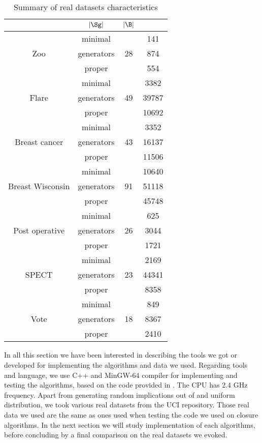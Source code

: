 \begin{table}[ht]
	\centering
	\begin{tabular}{| c | c | c | c |}
		\hline \rowcolor{clouds}
		\multicolumn{2}{|c|}{$\I$} & $|\Sg|$ & $|\B|$ \\ \hline
		\multirow{3}{*}{Zoo} & minimal & \multirow{3}{*}{28} & 141 \\
		& generators & & 874 \\
		& proper & & 554 \\ \hline
		
		\multirow{3}{*}{Flare} & minimal & \multirow{3}{*}{49} & 3382 \\
		& generators & & 39787 \\
		& proper & & 10692 \\ \hline
		
		\multirow{3}{*}{Breast cancer} & minimal & \multirow{3}{*}{43} & 3352 \\
		& generators & & 16137 \\
		& proper & & 11506 \\ \hline
		
		\multirow{3}{*}{Breast Wisconsin} & minimal & \multirow{3}{*}{91} & 10640 \\
		& generators & & 51118 \\
		& proper & & 45748 \\ \hline
		
		\multirow{3}{*}{Post operative} & minimal & \multirow{3}{*}{26} & 625 \\
		& generators & & 3044 \\
		& proper & & 1721 \\ \hline
		
		\multirow{3}{*}{SPECT} & minimal & \multirow{3}{*}{23} & 2169 \\
		& generators & & 44341 \\
		& proper & & 8358 \\ \hline
		
		\multirow{3}{*}{Vote} & minimal & \multirow{3}{*}{18} & 849 \\
		& generators & & 8367 \\
		& proper & & 2410 \\ \hline
	\end{tabular}
\caption{Summary of real datasets characteristics}
\label{tab:real-DS}
\end{table}


In all this section we have been interested in describing the tools we got or developed for implementing the algorithms and data we used. Regarding tools and language, we use C++ and MinGW-64 compiler for implementing and testing the algorithms, based on the code provided in \cite{bazhanov_optimizations_2014}. The CPU has 2.4 GHz frequency. Apart from generating random implications out
of  and uniform distribution, we took various real datasets from the UCI repository. Those real data we used are the same as ones used when testing the code we used on closure algorithms. In the next section we will study implementation of each algorithms, before concluding by a final comparison on 
the real datasets we evoked.

